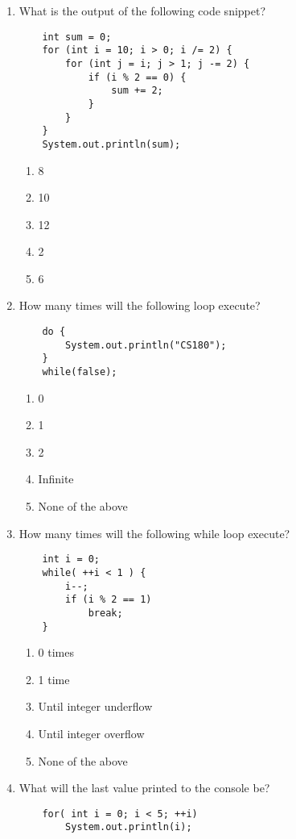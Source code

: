 \documentclass[S17-Final.tex]{subfiles}
\begin{document}
\begin{enumerate}
\item What is the output of the following code snippet?
\begin{lstlisting}
    int sum = 0;
    for (int i = 10; i > 0; i /= 2) {
        for (int j = i; j > 1; j -= 2) {
            if (i % 2 == 0) {
                sum += 2;
            }
        }
    }
    System.out.println(sum);
\end{lstlisting}
	
\begin{enumerate}
\item  8
\item  10
\item  12
\item  2
\item  6
\end{enumerate}

\item How many times will the following loop execute?
\begin{lstlisting}
    do {
	    System.out.println("CS180");
    }
    while(false);
\end{lstlisting}
	
\begin{enumerate}
\item  0
\item  1
\item  2
\item  Infinite
\item  None of the above
\end{enumerate}

\item How many times will the following while loop execute?
\begin{lstlisting}
    int i = 0;
    while( ++i < 1 ) {
        i--;
        if (i % 2 == 1)
            break;
    }
\end{lstlisting}
	
\begin{enumerate}
\item  0 times
\item  1 time
\item  Until integer underflow
\item  Until integer overflow
\item  None of the above
\end{enumerate}

\item What will the last value printed to the console be?
\begin{lstlisting}
    for( int i = 0; i < 5; ++i)
        System.out.println(i);
\end{lstlisting}
	

\end{enumerate}
\end{document}
